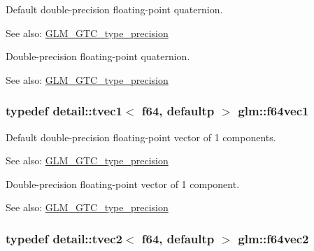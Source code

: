 Default double-precision floating-point quaternion. \begin{Desc}
\item[See also:]\hyperlink{group__gtc__type__precision}{GLM\_\-GTC\_\-type\_\-precision}\end{Desc}
Double-precision floating-point quaternion. \begin{Desc}
\item[See also:]\hyperlink{group__gtc__type__precision}{GLM\_\-GTC\_\-type\_\-precision} \end{Desc}
\hypertarget{group__gtc__type__precision_g55bdb96a24de2e3531c74310b12ba5d7}{
\subsubsection[f64vec1]{\setlength{\rightskip}{0pt plus 5cm}typedef detail::tvec1$<$ f64, defaultp $>$ {\bf glm::f64vec1}}}
\label{group__gtc__type__precision_g55bdb96a24de2e3531c74310b12ba5d7}


Default double-precision floating-point vector of 1 components. \begin{Desc}
\item[See also:]\hyperlink{group__gtc__type__precision}{GLM\_\-GTC\_\-type\_\-precision}\end{Desc}
Double-precision floating-point vector of 1 component. \begin{Desc}
\item[See also:]\hyperlink{group__gtc__type__precision}{GLM\_\-GTC\_\-type\_\-precision} \end{Desc}
\hypertarget{group__gtc__type__precision_g3f131d462df8154918f93ba1ac7cc4bd}{
\subsubsection[f64vec2]{\setlength{\rightskip}{0pt plus 5cm}typedef detail::tvec2$<$ f64, defaultp $>$ {\bf glm::f64vec2}}}
\label{group__gtc__type__precision_g3f131d462df8154918f93ba1ac7cc4bd}


